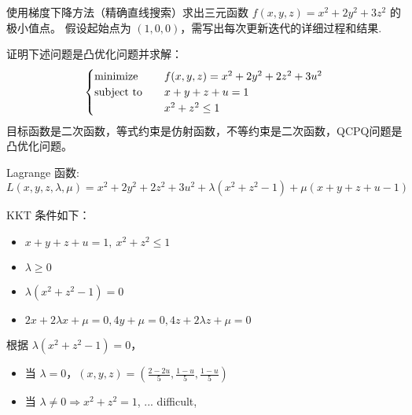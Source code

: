 \begin{problem}[问答]
    使用梯度下降方法（精确直线搜索）求出三元函数 $f(x, y, z) = x^2 + 2y^2 + 3z^2$ 的极小值点。 假设起始点为 $(1, 0, 0)$，需写出每次更新迭代的详细过程和结果.
    \Answer 
\end{problem}

\begin{problem}[问答]
    证明下述问题是凸优化问题并求解：\[\begin{cases}
        \operatorname{minimize} \quad &f(x, y, z) = x^2 + 2y^2 + 2z^2 + 3u^2\\
        \operatorname{subject\ to} \quad &x + y + z + u = 1\\
        &x^2 + z^2 \le 1 
    \end{cases}\]
    \Answer 目标函数是二次函数，等式约束是仿射函数，不等约束是二次函数，QCPQ问题是凸优化问题。

    Lagrange 函数: $L(x, y, z, \lambda, \mu) = x^2 + 2y^2 + 2z^2 + 3u^2 + \lambda(x^2 + z^2 - 1) + \mu(x + y + z + u - 1)$

    KKT 条件如下：\begin{itemize}
        \item $x + y + z + u = 1,\ x^2 + z^2 \le 1$
        \item $\lambda \ge 0$
        \item $\lambda(x^2 + z^2 - 1) = 0$
        \item $2x + 2\lambda x + \mu = 0, 4y + \mu = 0, 4z + 2\lambda z + \mu = 0$
    \end{itemize}
    根据 $\lambda(x^2 + z^2 - 1) = 0$，\begin{itemize}
        \item 当 $\lambda = 0$，$(x, y, z) = (\frac{2 - 2u}{5}, \frac{1 - u}{5}, \frac{1 - u}{5})$
        \item 当 $\lambda \neq 0 \Longrightarrow x^2 + z^2 = 1$, ... difficult, 
    \end{itemize}
\end{problem}

